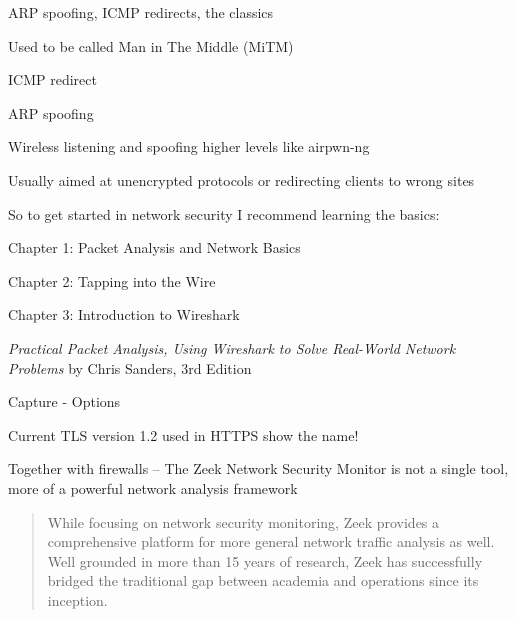 \documentclass[Screen16to9,17pt]{foils}
\begin{document}

\begin{list1}
\item ARP spoofing, ICMP redirects, the classics
\item Used to be called Man in The Middle (MiTM)
\begin{list2}
\item ICMP redirect
\item ARP spoofing
\item Wireless listening and spoofing higher levels like  airpwn-ng 
\end{list2}
\item Usually aimed at unencrypted protocols or redirecting clients to wrong sites
\end{list1}



So to get started in network security I recommend learning the basics:
\begin{list2}
\item Chapter 1: Packet Analysis and Network Basics
\item Chapter 2: Tapping into the Wire
\item Chapter 3: Introduction to Wireshark
\end{list2}
\emph{Practical Packet Analysis,
Using Wireshark to Solve Real-World Network Problems}
by Chris Sanders, 3rd Edition





\centerline{Capture - Options}



\centerline{Current TLS version 1.2 used in HTTPS show the name!}



Together with firewalls -- The Zeek Network Security Monitor is not a single tool, more of a powerful network analysis framework


\begin{quote}
While focusing on network security monitoring, Zeek provides a comprehensive platform for more general network traffic analysis as well. Well grounded in more than 15 years of research, Zeek has successfully bridged the traditional gap between academia and operations since its inception.
\end{quote}
\end{document}
